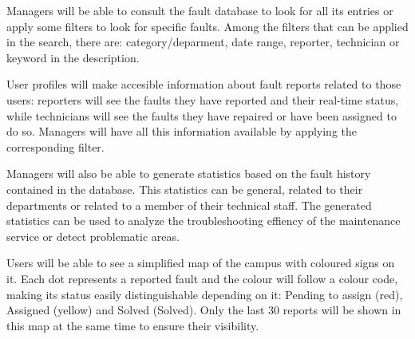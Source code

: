 Managers will be able to consult the fault database to look for all its entries or apply some filters to look for specific faults. Among the filters that can be applied in the search, there are: category/deparment, date range, reporter, technician or keyword in the description.

User profiles will make accesible information about fault reports related to those users: reporters will see the faults they have reported and their real-time status, while technicians will see the faults they have repaired or have been assigned to do so. Managers will have all this information available by applying the corresponding filter.

Managers will also be able to generate statistics based on the fault history contained in the database. This statistics can be general, related to their departments or related to a member of their technical staff. The generated statistics can be used to analyze the troubleshooting effiency of the maintenance service or detect problematic areas.

Users will be able to see a simplified map of the campus with coloured signs on it. Each dot represents a reported fault and the colour will follow a colour code, making its status easily distinguishable depending on it: Pending to assign (red), Assigned (yellow) and Solved (Solved). Only the last 30 reports will be shown in this map at the same time to ensure their visibility.

